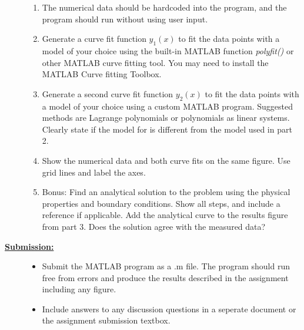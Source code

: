 \documentclass[12pt]{article}
\newcommand{\ANUM}{8} %
\begin{document}
\begin{description}
\begin{enumerate}	
	
	\item The numerical data should be hardcoded into the program, and the program should run without using user input. 

	\item Generate a curve fit function $y_1(x)$ to fit the data points with a model of your choice using the built-in MATLAB function {\it polyfit()} or other MATLAB curve fitting tool. You may need to install the MATLAB Curve fitting Toolbox. 

	\item Generate a second curve fit function $y_2(x)$ to fit the data points with a model of your choice using a custom MATLAB program. Suggested methods are Lagrange polynomials or polynomials as linear systems. Clearly state if the model for is different from the model used in part 2.

	\item Show the numerical data and both curve fits on the same figure. Use grid lines and label the axes.

	\item Bonus: Find an analytical solution to the problem using the physical properties and boundary conditions. Show all steps, and include a reference if applicable. Add the analytical curve to the results figure from part 3. Does the solution agree with the measured data?

\end{enumerate}

\newpage	



\item[\textbf{\underline{Submission:}}] \hfill \vspace{0mm}

	\begin{itemize}

		\item Submit the MATLAB program as a .m file. The program should run free from errors and produce the results described in the assignment including any figure. 

		\item Include answers to any discussion questions in a seperate document or the assignment submission textbox. 

	\end{itemize}		



\end{description}
\end{document}
